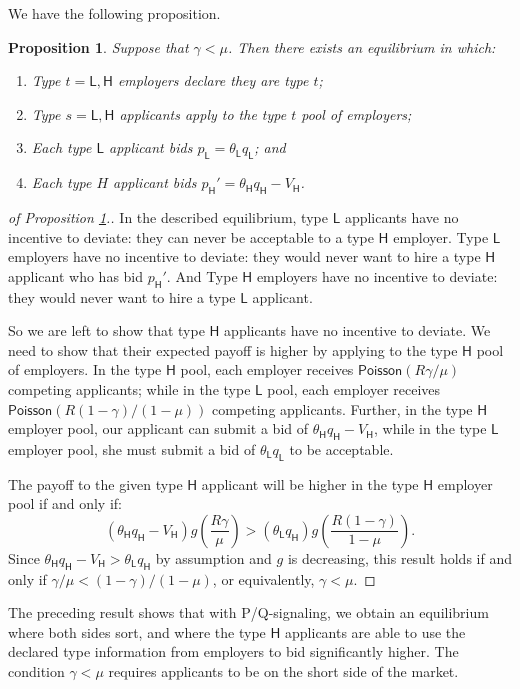 \documentclass[prodmode,acmec]{ec-acmsmall}
\renewcommand{\H}{\ensuremath{\mathsf{H}}}
\renewcommand{\L}{\ensuremath{\mathsf{L}}}
\newcommand{\poiss}{\ensuremath{\mathsf{Poisson}}}
\newtheorem{prop}{Proposition}
\newcommand{\hottowel}{P/Q-signaling}
\begin{document}
We have the following proposition.

\begin{prop}
\label{prop:sorteq}
Suppose that $\gamma < \mu$.
Then there exists an equilibrium in which:
\begin{enumerate}
\item Type $t = \L,\H$ employers declare they are type $t$;
\item Type $s = \L,\H$ applicants apply to the type $t$ pool of employers;
\item Each type $\L$ applicant bids $p_\L = \theta_\L q_\L$; and
\item Each type $H$ applicant bids $p_\H' = \theta_\H q_\H - V_\H$.
\end{enumerate}
\end{prop}

\begin{proof}[of Proposition \ref{prop:sorteq}.]
In the described equilibrium, type $\L$ applicants have no incentive to deviate: they can never be acceptable to a type $\H$ employer.
Type $\L$ employers have no incentive to deviate: they would never want to hire a type $\H$ applicant who has bid $p_\H'$.
And Type $\H$ employers have no incentive to deviate: they would never want to hire a type $\L$ applicant.

So we are left to show that type $\H$ applicants have no incentive to deviate.
We need to show that their expected payoff is higher by applying to the type $\H$ pool of employers.
In the type $\H$ pool, each employer receives $\poiss(R \gamma/\mu)$ competing applicants;
while in the type $\L$ pool, each employer receives $\poiss(R (1-\gamma)/(1-\mu))$ competing applicants.
Further, in the type $\H$ employer pool, our applicant can submit a bid of $\theta_\H q_\H - V_\H$, while in the type $\L$ employer pool, she must submit a bid of $\theta_\L q_\L$ to be acceptable.

The payoff to the given type $\H$ applicant will be higher in the type $\H$ employer pool if and only if:
\[ (\theta_\H q_\H - V_\H) g\left( \frac{R\gamma}{\mu}\right) > ( \theta_\L q_\H) g\left( \frac{R(1-\gamma)}{1-\mu}\right). \]
Since $\theta_\H q_\H - V_\H > \theta_\L q_\H$ by assumption and $g$ is decreasing, this result holds if and only if $\gamma/\mu  < (1-\gamma)/(1-\mu)$, or equivalently, $\gamma < \mu$.
\end{proof}

The preceding result shows that with \hottowel, we obtain an equilibrium where both sides sort, and where the type $\H$ applicants are able to use the declared type information from employers to bid significantly higher.
The condition $\gamma < \mu$ requires applicants to be on the short side of the market.
\end{document}
